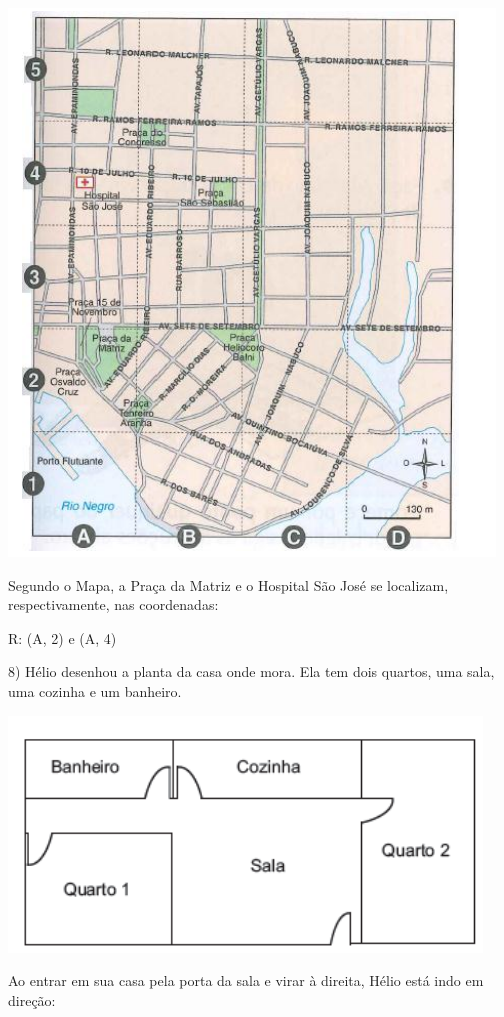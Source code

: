 \includegraphics[width=5.08333in,height=5.71875in]{./imgSAEB_6_MAT/media/image70.png}

Segundo o Mapa, a Praça da Matriz e o Hospital São José se localizam,
respectivamente, nas coordenadas:

R: (A, 2) e (A, 4)

8) Hélio desenhou a planta da casa onde mora. Ela tem dois quartos, uma
sala, uma cozinha e um banheiro.

\includegraphics[width=4.94792in,height=2.46875in]{./imgSAEB_6_MAT/media/image71.png}

Ao entrar em sua casa pela porta da sala e virar à direita, Hélio está
indo em direção:


